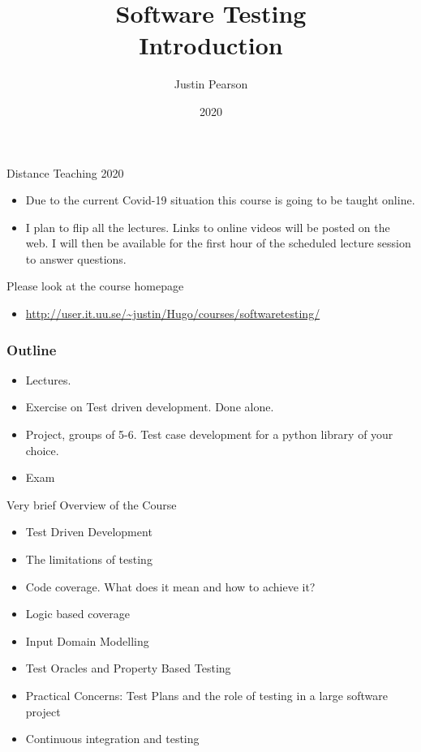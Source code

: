 \documentclass{beamer}
\title{Software Testing \\ Introduction}
\author{Justin Pearson}
\date{2020}
\begin{document}
\lstset{language=python}

\begin{frame}
  \maketitle
\end{frame}
\begin{frame}{Distance Teaching 2020}
  \begin{itemize}
  \item   Due to the current Covid-19 situation this course is going to be
  taught online. 
 \item  I plan to flip all the lectures. Links to online videos will
   be posted on the web. I will then  be available for the first hour
   of the scheduled lecture session to answer questions.
 \end{itemize}
 Please look at the course homepage
 \begin{itemize}
 \item \url{http://user.it.uu.se/~justin/Hugo/courses/softwaretesting/}
 \end{itemize}
\end{frame}
\begin{frame}
  \frametitle{Outline}
  \begin{itemize}
  \item Lectures.
  \item Exercise on Test driven development. Done alone.
  \item Project, groups of 5-6. Test case development for a python
    library of your choice.
  \item Exam
  \end{itemize}
\end{frame}
\begin{frame}{Very brief Overview of the Course}
  \begin{itemize}
  \item Test Driven Development
  \item The limitations of testing
  \item Code coverage. What does it mean and how to achieve it?
  \item Logic based coverage
  \item Input Domain Modelling
  \item Test Oracles and Property Based Testing
  \item Practical Concerns: Test Plans and the role of testing in a
    large software project
  \item Continuous integration and testing 
  \end{itemize}
\end{frame}
\end{document}
